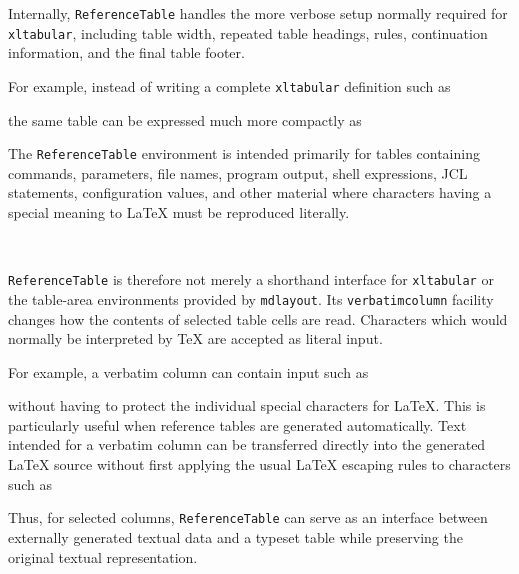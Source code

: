 \documentclass[
11pt,
a4paper,
oneside
]{scrbook}
\begin{document}
Internally, \texttt{ReferenceTable} handles the more verbose setup normally
required for \texttt{xltabular}, including table width, repeated table
headings, rules, continuation information, and the final table footer.

For example, instead of writing a complete \texttt{xltabular} definition such
as






\noindent
the same table can be expressed much more compactly as





The \texttt{ReferenceTable} environment is intended primarily for tables
containing commands, parameters, file names, program output, shell
expressions, JCL statements, configuration values, and other material where
characters having a special meaning to \LaTeX{} must be reproduced literally.

\begin{SynchronizedMarginAndTextArea}
	\begin{TextInMarginArea}
		{\centering{}\\}
	\end{TextInMarginArea}
	\begin{TextInTextArea}
		\texttt{ReferenceTable} is therefore not merely a shorthand interface
		for \texttt{xltabular} or the table-area environments provided by
		\texttt{mdlayout}. Its \texttt{verbatimcolumn} facility changes how
		the contents of selected table cells are read. Characters which would
		normally be interpreted by \TeX{} are accepted as literal input.
	\end{TextInTextArea}
\end{SynchronizedMarginAndTextArea}
For example, a verbatim column can contain input such as




without having to protect the individual special characters for \LaTeX{}.
This is particularly useful when reference tables are generated
automatically. Text intended for a verbatim column can be transferred
directly into the generated \LaTeX{} source without first applying the usual
\LaTeX{} escaping rules to characters such as




Thus, for selected columns, \texttt{ReferenceTable} can serve as an interface
between externally generated textual data and a typeset table while
preserving the original textual representation.
\end{document}
